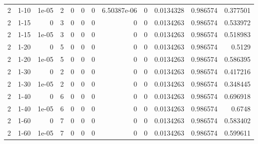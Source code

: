 \begin{tabular}{rlrrrrrrrrrr}
     2 & 1-10   &      1e-05 &           2 &                 0 &                 0 &     0           &     6.50387e-06 &      0           &        0.0134328 &               0.986574 &           0.377501 \\
     2 & 1-15   &      0     &           3 &                 0 &                 0 &     0           &     0           &      0           &        0.0134263 &               0.986574 &           0.533972 \\
     2 & 1-15   &      1e-05 &           3 &                 0 &                 0 &     0           &     0           &      0           &        0.0134263 &               0.986574 &           0.518983 \\
     2 & 1-20   &      0     &           5 &                 0 &                 0 &     0           &     0           &      0           &        0.0134263 &               0.986574 &           0.5129   \\
     2 & 1-20   &      1e-05 &           5 &                 0 &                 0 &     0           &     0           &      0           &        0.0134263 &               0.986574 &           0.586395 \\
     2 & 1-30   &      0     &           2 &                 0 &                 0 &     0           &     0           &      0           &        0.0134263 &               0.986574 &           0.417216 \\
     2 & 1-30   &      1e-05 &           2 &                 0 &                 0 &     0           &     0           &      0           &        0.0134263 &               0.986574 &           0.348445 \\
     2 & 1-40   &      0     &           6 &                 0 &                 0 &     0           &     0           &      0           &        0.0134263 &               0.986574 &           0.696918 \\
     2 & 1-40   &      1e-05 &           6 &                 0 &                 0 &     0           &     0           &      0           &        0.0134263 &               0.986574 &           0.6748   \\
     2 & 1-60   &      0     &           7 &                 0 &                 0 &     0           &     0           &      0           &        0.0134263 &               0.986574 &           0.583402 \\
     2 & 1-60   &      1e-05 &           7 &                 0 &                 0 &     0           &     0           &      0           &        0.0134263 &               0.986574 &           0.599611 \\

\end{tabular}
